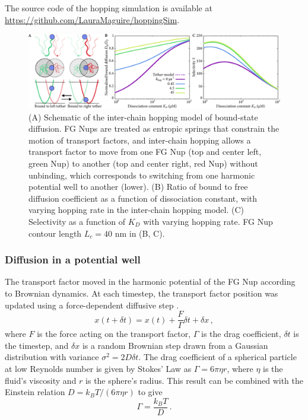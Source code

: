The source code of the hopping simulation is available at \url{https://github.com/LauraMaguire/hoppingSim}.

\begin{figure}
\centering
\includegraphics[width = \textwidth]{figs/ch02/fig4.pdf}
\caption[Selectivity from inter-chain hopping.]{(A) Schematic of the inter-chain hopping model of bound-state diffusion. FG Nups are treated as entropic springs that constrain the motion of transport factors, and inter-chain hopping allows a transport factor to move from one FG Nup (top and center left, green Nup) to another (top and center right, red Nup) without unbinding, which corresponds to switching from one harmonic potential well to another (lower). (B) Ratio of bound to free diffusion coefficient as a function of dissociation constant, with varying hopping rate in the inter-chain hopping model.  (C) Selectivity as a function of $K_D$ with varying hopping rate. FG Nup contour length $L_c = 40$ nm in (B, C). }
\label{fig:hopping}
\end{figure}

\subsubsection{Diffusion in a potential well}

The transport factor moved in the harmonic potential of the FG Nup according to Brownian dynamics. At each timestep, the transport factor position was updated using a force-dependent diffusive step \cite{blackwell17}.
\begin{equation}
  x(t+\delta t) = x(t) + \frac{F}{\Gamma} \delta t + \delta x\,,
\end{equation} 
where $F$ is the force acting on the transport factor, $\Gamma$ is the drag coefficient, $\delta t$ is the timestep, and $\delta x$ is a random Brownian step drawn from a Gaussian distribution with variance $\sigma^2 = 2 D \delta t$. The drag coefficient of a spherical particle at low Reynolds number is given by Stokes' Law as $\Gamma = 6 \pi \eta r$, where $\eta$ is the fluid's viscosity and $r$ is the sphere's radius.  This result can be combined with the Einstein relation $D = k_B T / (6\pi \eta r)$ to give
\begin{equation}
\Gamma= \frac{k_B T}{D}\,.
\end{equation}
 
